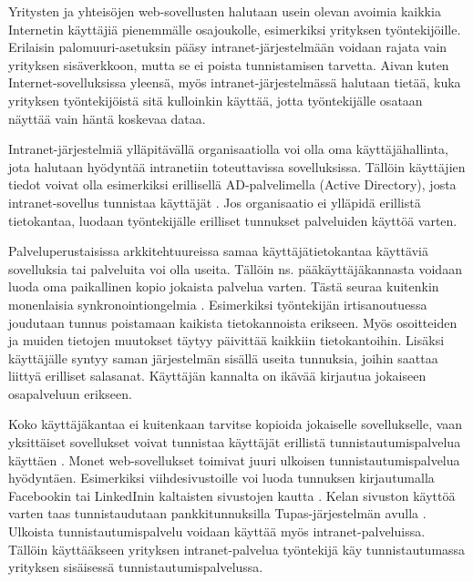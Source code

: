Yritysten ja yhteisöjen web-sovellusten halutaan usein olevan avoimia kaikkia Internetin käyttäjiä pienemmälle osajoukolle, esimerkiksi yrityksen työntekijöille. Erilaisin palomuuri-asetuksin pääsy intranet-järjestelmään voidaan rajata vain yrityksen sisäverkkoon, mutta se ei poista tunnistamisen tarvetta. Aivan kuten Internet-sovelluksissa yleensä, myös intranet-järjestelmässä halutaan tietää, kuka yrityksen työntekijöistä sitä kulloinkin käyttää, jotta työntekijälle osataan näyttää vain häntä koskevaa dataa.

Intranet-järjestelmiä ylläpitävällä organisaatiolla voi olla oma käyttäjähallinta, jota halutaan hyödyntää intranetiin toteuttavissa sovelluksissa. Tällöin käyttäjien tiedot voivat olla esimerkiksi erillisellä AD-palvelimella (Active Directory), josta intranet-sovellus tunnistaa käyttäjät \cite{active_directory}. Jos organisaatio ei ylläpidä erillistä tietokantaa, luodaan työntekijälle erilliset tunnukset palveluiden käyttöä varten.

Palveluperustaisissa arkkitehtuureissa samaa käyttäjätietokantaa käyttäviä sovelluksia tai palveluita voi olla useita. Tällöin ns. pääkäyttäjäkannasta voidaan luoda oma paikallinen kopio jokaista palvelua varten. Tästä seuraa kuitenkin monenlaisia synkronointiongelmia \cite{synkronointi}. Esimerkiksi työntekijän irtisanoutuessa joudutaan tunnus poistamaan kaikista tietokannoista erikseen. Myös osoitteiden ja muiden tietojen muutokset täytyy päivittää kaikkiin tietokantoihin. Lisäksi käyttäjälle syntyy saman järjestelmän sisällä useita tunnuksia, joihin saattaa liittyä erilliset salasanat. Käyttäjän kannalta on ikävää kirjautua jokaiseen osapalveluun erikseen.

Koko käyttäjäkantaa ei kuitenkaan tarvitse kopioida jokaiselle sovellukselle, vaan yksittäiset sovellukset voivat tunnistaa käyttäjät erillistä tunnistautumispalvelua käyttäen \cite{facebook}. Monet web-sovellukset toimivat juuri ulkoisen tunnistautumispalvelua hyödyntäen. Esimerkiksi viihdesivustoille voi luoda tunnuksen kirjautumalla Facebookin tai LinkedInin kaltaisten sivustojen kautta \cite{facebook}. Kelan sivuston käyttöä varten taas tunnistaudutaan pankkitunnuksilla Tupas-järjestelmän avulla \cite{tupas}. Ulkoista tunnistautumispalvelu voidaan käyttää myös intranet-palveluissa. Tällöin käyttääkseen yrityksen intranet-palvelua työntekijä käy tunnistautumassa yrityksen sisäisessä tunnistautumispalvelussa.